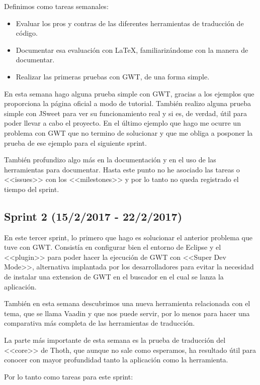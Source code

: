 Definimos como tareas semanales:

\begin{itemize}
\item Evaluar los pros y contras de las diferentes herramientas de traducción de código.
\item Documentar esa evaluación con \LaTeX , familiarizándome con la manera de documentar.
\item Realizar las primeras pruebas con GWT, de una forma simple.
\end{itemize}

En esta semana hago alguna prueba simple con GWT, gracias a los ejemplos que proporciona la página oficial a modo de tutorial. También realizo alguna prueba simple con JSweet para ver su funcionamiento real y si es, de verdad, útil para poder llevar a cabo el proyecto. En el último ejemplo que hago me ocurre un problema con GWT que no termino de solucionar y que me obliga a posponer la prueba de ese ejemplo para el siguiente sprint.

También profundizo algo más en la documentación y en el uso de las herramientas para documentar. Hasta este punto no he asociado las tareas o <<issues>> con los <<milestones>> y por lo tanto no queda registrado el tiempo del sprint.

\subsection{Sprint 2 (15/2/2017 - 22/2/2017)}

En este tercer sprint, lo primero que hago es solucionar el anterior problema que tuve con GWT. Consistía en configurar bien el entorno de Eclipse y el <<plugin>> para poder hacer la ejecución de GWT con <<Super Dev Mode>>, alternativa implantada por los desarrolladores para evitar la necesidad de instalar una extension de GWT en el buscador en el cual se lanza la aplicación.

También en esta semana descubrimos una nueva herramienta relacionada con el tema, que se llama Vaadin y que nos puede servir, por lo menos para hacer una comparativa más completa de las herramientas de traducción. 

La parte más importante de esta semana es la prueba de traducción del <<core>> de Thoth, que aunque no sale como esperamos, ha resultado útil para conocer con mayor profundidad tanto la aplicación como la herramienta.

Por lo tanto como tareas para este sprint:

